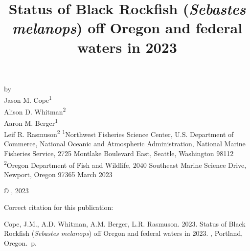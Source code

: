 \documentclass[11pt,
  english,
  letterpaper,
]{article}
\date{}
\newcommand{\trTitle}{Status of Black Rockfish (\emph{Sebastes melanops}) off Oregon and federal waters in 2023}
\newcommand{\trYear}{2023}
\newcommand{\trMonth}{March}
\newcommand{\trAuthsBack}{Cope, J.M., A.D. Whitman, A.M. Berger, L.R. Rasmuson}
\newcommand{\trCitation}{
\begin{hangparas}{1em}{1}
\trAuthsBack{}. \trYear{}. \trTitle{}. \glsentrylong{pfmc}, Portland, Oregon. \pageref{LastPage}{}\,p.
\end{hangparas}}
\begin{document}

\renewcommand*{\thefootnote}{\fnsymbol{footnote}}

\small
\thispagestyle{empty}
\noindent
\begin{center}
\title{Status of Black Rockfish (\emph{Sebastes melanops}) off Oregon and federal waters in 2023}
\vspace{1.5cm}
{\Large\textbf{}}
\vfill
by\\
Jason M. Cope\textsuperscript{1}\\
Alison D. Whitman\textsuperscript{2}\\
Aaron M. Berger\textsuperscript{1}\\
Leif R. Rasmuson\textsuperscript{2}\vfill
\textsuperscript{1}Northwest Fisheries Science Center, U.S. Department of Commerce, National Oceanic and Atmospheric Administration, National Marine Fisheries Service, 2725 Montlake Boulevard East, Seattle, Washington 98112\\
\textsuperscript{2}Oregon Department of Fish and Wildlife, 2040 Southeast Marine Science Drive, Newport, Oregon 97365\vfill
\trMonth{} \trYear{}
\end{center}
\clearpage

\thispagestyle{empty}
\vspace*{\fill}
\begin{center}
\copyright{} , \trYear{}\\
\end{center}
\par
\bigskip
\noindent
Correct citation for this publication:
\bigskip
\par
\trCitation{}
\clearpage


\tableofcontents\clearpage
\label{TRlastRoman}
\clearpage

\newpage
\thispagestyle{empty} %

\pagestyle{plain}  %
\renewcommand*{\thefootnote}{\arabic{footnote}}  %
\setcounter{footnote}{0}  %
\renewcommand{\headrulewidth}{0.5pt}
\renewcommand{\footrulewidth}{0.5pt}
\end{document}
